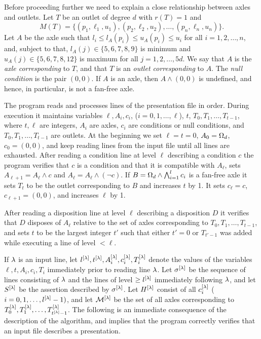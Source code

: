 Before proceeding further we need to explain a close relationship between 
axles and outlets.
Let $T$ be an outlet of degree $d$ with $r(T)=1$ and 
$$M(T)=\{(p_1,\ell_1,u_1),(p_2,\ell_2,u_2),\dots,
(p_n,\ell_n,u_n)\}.$$
Let $A$ be the axle such that $l_i\le l_A(p_i)\le u_A(p_i)\le u_i$
for all $i=1,2,\ldots,n$,
and, subject to that, $l_A(j)\in\{5,6,7,8,9\}$ is minimum and
$u_A(j)\in\{5,6,7,8,12\}$ is maximum for all $j=1,2,\ldots,5d$.
We say that
$A$ is the {\it axle corresponding} to $T$, and that $T$ is an {\it
outlet  corresponding}
to $A$.
The {\it null condition} is the pair $(0,0)$.  If $A$ is an axle, then 
$A\wedge (0,0)$
is undefined, and hence, in particular, is not a fan-free axle.  

The program reads and processes lines of the presentation file in order.  
During execution it
maintains variables $\ell, A_i, c_i$, ($i=0,1,\dots, \ell$), $t$, $T_0, 
T_1,\dots, T_{t-1}$,
where $t,\ell$ are integers, $A_i$ are axles, $c_i$ are conditions or 
null conditions, and
$T_0, T_1,\dots, T_{t-1}$ are outlets.  At the beginning we set $\ell=t=0$,
$A_0=\Omega_d$, $c_0=(0,0)$, and keep reading lines from the input file 
until all lines
are exhausted.  After reading a condition line at level $\ell$ describing 
a condition $c$ the 
program verifies that $c$ is a condition and that it is compatible with 
$A_\ell$, sets
$A_{\ell+1}=A_\ell \wedge c$ and $A_\ell = A_\ell \wedge (\neg c)$.  If
$B=\Omega_d \wedge \bigwedge^l_{i=1}c_i$ is a fan-free axle it sets
$T_t$ to be  the outlet
corresponding to $B$ and increases $t$ by 1.  It sets $c_\ell=c$, $c_{\ell+1}=(0,0)$,
and increases $\ell$ by 1.

After reading a disposition line at level $\ell$ describing a disposition 
$D$ it verifies that $D$
disposes of $A_\ell$ relative to the set of axles corresponding to $T_0,T_1, 
\dots,
T_{t-1}$, and sets $t$ to be the largest integer $t'$ such that either 
$t'=0$ or $T_{t'-1}$
was added while executing a line of level $<\ell$.

If $\lambda$ is an input line, let $l^{[\lambda]}, t^{[\lambda]}, A^{[\lambda]}_i, 
c^{[\lambda]}_i,
T^{[\lambda]}_i$ denote the values of the variables $\ell, t, A_i, c_i, T_i$ 
immediately
prior to reading line $\lambda$.  Let $\sigma^{[\lambda]}$ be the sequence of 
lines consisting of $\lambda$ and the
lines of level $\ge l^{[\lambda]}$ immediately following $\lambda$, and 
let
$S^{[\lambda]}$ be the assertion described by $\sigma^{[\lambda]}$.  Let $H^{[\lambda]}$ 
consist of all $c^{[\lambda]}_i$ ($i=0,1,\dots, l^{[\lambda]}-1)$, and
let ${\cal M}^{[\lambda]}$ be the set of all axles corresponding to $T^{[\lambda]}_0,
T^{[\lambda]}_1,\dots, T^{[\lambda]}_{t^{[\lambda]}-1}$.  The following is an 
immediate consequence of
the description of the algorithm, and implies that the program
correctly verifies that  an input file describes
a presentation.

